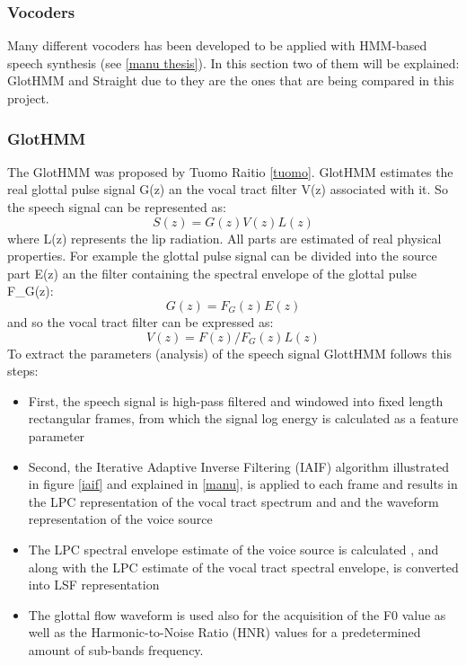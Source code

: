 \subsubsection{Vocoders}\label{voco-a-s}
Many different vocoders has been developed to be applied with HMM-based speech synthesis (see \ref{manu thesis}). In this section two of them will be explained: GlotHMM and Straight due to they are the ones that are being compared in this project.
\subsubsection{GlotHMM}
The GlotHMM was proposed by Tuomo Raitio \ref{tuomo}. GlotHMM estimates the real glottal pulse signal G(z) an the vocal tract filter V(z) associated with it. So the speech signal can be represented as:
\begin{equation}
	S(z) = G(z)V(z)L(z) 
\end{equation}
where L(z) represents the lip radiation. All parts are estimated of real physical properties. For example the glottal pulse signal can be divided into the source part E(z) an the filter containing the spectral envelope of the glottal pulse F\_{G}(z):
\begin{equation}
	G(z) = F_{G}(z)E(z)
\end{equation}
and so the vocal tract filter can be expressed as:
\begin{equation}
	V(z) = F(z)/F_{G}(z)L(z) 
\end{equation} %
To extract the parameters (analysis) of the speech signal GlottHMM follows this steps:
\begin{itemize}
	\item First, the speech signal is high-pass filtered and windowed into fixed length rectangular frames, from which the signal log energy is calculated as a feature parameter
	\item Second, the Iterative Adaptive Inverse Filtering (IAIF) algorithm illustrated in figure \ref{iaif} and explained in \ref{manu}, is applied to each frame and results in the LPC representation of the vocal tract spectrum and and the waveform representation of the voice source
	\item The LPC spectral envelope estimate of the voice source is calculated , and along with the LPC estimate of the vocal tract spectral envelope, is converted into LSF representation
	\item The glottal flow waveform is used also for the acquisition of the F0 value as well as the Harmonic-to-Noise Ratio (HNR) values for a predetermined amount of sub-bands frequency. 
\end{itemize}
